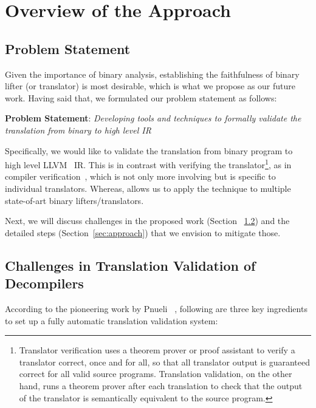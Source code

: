 \chapter{Overview of the Approach}\label{sec:overview}
\section{Problem Statement}\label{sec:statement}


Given the importance of binary analysis, establishing the faithfulness of
binary lifter (or translator) is most desirable, which is what we propose as
our future work. Having said that, we formulated our problem statement as
follows:

\vspace{10pt}

\noindent\textbf{Problem Statement}: \emph{Developing
   tools and techniques to formally validate the
    translation from binary to high level IR}

Specifically, we would like to validate the translation from \ISA binary
program  to high level LLVM~\cite{LLVM:CGO04} IR. This is in contrast with  verifying the
translator\footnote{Translator verification uses a theorem prover or proof
    assistant to verify a translator correct, once and for all, so that all
    translator output is guaranteed correct for all valid source programs.
    Translation validation, on the other hand, runs a theorem prover after each
    translation to check that the output of the translator is semantically
    equivalent to the source program.}, as in  compiler
verification~\cite{Leroy:2009}, which is not only more involving but is
specific to individual translators. Whereas, \tv allows us to apply the technique to multiple state-of-art binary
lifters/translators. 

Next, we will discuss challenges in the proposed work (Section
    ~\ref{sec:challenges}) and the detailed steps (Section~\ref{sec:approach})
that we envision to mitigate those.

\section{Challenges in Translation Validation of
  Decompilers}\label{sec:challenges} According to the pioneering work by Pnueli
  \etal ~\cite{Pnueli:1998}, following are three key ingredients to set up a
  fully automatic translation validation system:

